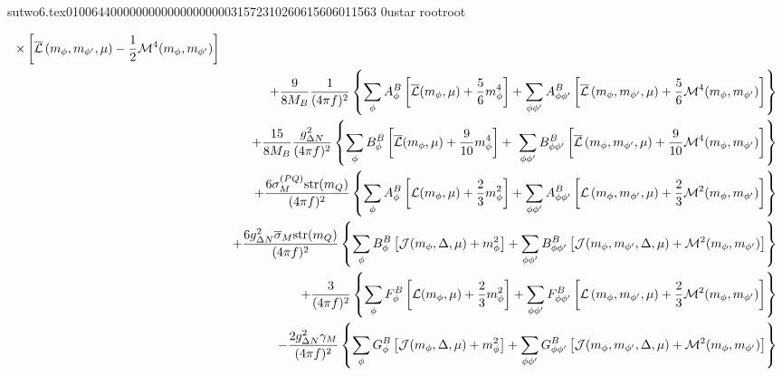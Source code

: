                                                                                                                                                                                                                                                                                       sutwo6.tex                                                                                          0100644 0000000 0000000 00000315723 10260615606 011563  0                                                                                                    ustar   root                            root                                                                                                                                                                                                                   \documentclass[prd,amssymb,amsmath,showpacs,nofootinbib,superscriptaddress]{revtex4}
\begin{document}
{\begin{eqnarray}
        \times \left[ {\overline{{\mathcal L}}} \left( m_\phi, m_{\phi'}, \mu \right)
          - \frac{1}{2} \mathcal{M}^4(m_\phi, m_{\phi'}) \right] \notag \\
&&  + \frac{9}{8 M_B} \frac{1}{(4 \pi f)^2} \left\{ 
        \sum_\phi A^B_\phi \left[ {\overline{{\mathcal L}}} (m_\phi, \mu) + \frac{5}{6}
          m_\phi^4 \right]
        + \sum_{\phi \phi'} A^B_{\phi \phi'} \left[
          {\overline{{\mathcal L}}} \left( m_\phi, m_{\phi'}, \mu \right)
          + \frac{5}{6} \mathcal{M}^4(m_\phi, m_{\phi'})
        \right]\right\} \notag \\
&&  +  \frac{15}{8 M_B} \frac{g_{{\Delta} N}^2}{(4 \pi f)^2} \left\{
         \sum_\phi B^B_\phi \left[ {\overline{{\mathcal L}}} (m_\phi, \mu) +
           \frac{9}{10} m_\phi^4 \right] 
         +\ \sum_{\phi \phi'} B^B_{\phi \phi'} \left[
           {\overline{{\mathcal L}}} \left( m_\phi, m_{\phi'}, \mu \right)
           + \frac{9}{10} \mathcal{M}^4(m_\phi, m_{\phi'})
         \right]\right\} \notag \\
&& + 
\frac{ 6 \sigma_M^{(PQ)} \text{str} (m_Q)}{(4 \pi f)^2} 
\left\{
\sum_\phi A^B_\phi 
\left[ {\mathcal L} (m_\phi, \mu) + \frac{2}{3} m_\phi^2 \right]
+ 
\sum_{\phi \phi'} A^B_{\phi \phi '} 
\left[
{\mathcal L} \left( m_\phi, m_{\phi'}, \mu \right)
+ \frac{2}{3} \mathcal{M}^2(m_\phi,m_{\phi'})
\right]
\right\}
\notag \\
&& +
\frac{6 g_{{\Delta} N}^2 {\overline{\sigma}}_M \text{str}(m_Q)}{(4 \pi f)^2} 
\left\{ 
\sum_\phi B^B_\phi 
\left[ {\mathcal J} (m_\phi, {\Delta}, \mu) + m_\phi^2 \right]
+
\sum_{\phi \phi'} B^B_{\phi \phi'} 
\left[
{\mathcal J} (m_\phi, m_{\phi'}, {\Delta}, \mu)
+
\mathcal{M}^2(m_\phi, m_{\phi'})
\right]
\right\}
\notag \\
&& + 
\frac{3}{ (4 \pi f)^2} 
\left\{
\sum_\phi F^B_\phi 
\left[ {\mathcal L} (m_\phi, \mu) + \frac{2}{3} m_\phi^2 \right]
+
\sum_{\phi \phi'} F^B_{\phi \phi'}
\left[
{\mathcal L} \left( m_\phi, m_{\phi'}, \mu \right)
+ 
\frac{2}{3} \mathcal{M}^2(m_\phi,m_{\phi'})
\right]
\right\}
\notag \\
&& - 
\frac{2 g_{{\Delta} N}^2 {\gamma}_M}{(4 \pi f)^2} 
\left\{
\sum_\phi G^B_\phi 
\left[ {\mathcal J} (m_\phi, {\Delta}, \mu) + m_\phi^2 \right]
+
\sum_{\phi \phi'} G^B_{\phi \phi'}
\left[
{\mathcal J}(m_\phi, m_{\phi'}, {\Delta}, \mu)
+
\mathcal{M}^2(m_\phi, m_{\phi'})
\right]
\right\}
\label{eq:NMPQNNLO}
\end{eqnarray}
}
%
%
%
%
\end{document}
